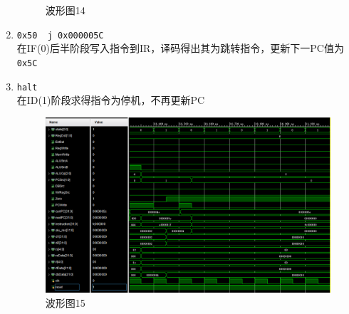 \begin{enumerate}
\begin{figure}[H]
\caption{波形图14}
\label{fig:wave_14}
\end{figure}
    \item \verb'0x50  j 0x000005C'\\
    在IF(0)后半阶段写入指令到IR，译码得出其为跳转指令，更新下一PC值为\verb'0x5C'
    \item \verb'halt'\\
    在ID(1)阶段求得指令为停机，不再更新PC
\begin{figure}[H]
\centering
\includegraphics[width=0.9\linewidth]{fig/FullIns/Ins15.PNG}
\caption{波形图15}
\label{fig:wave_15}
\end{figure}
\end{enumerate}
